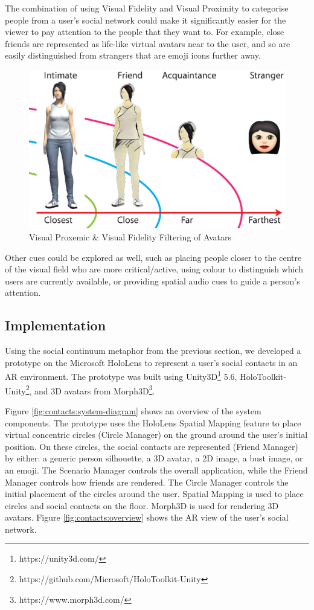 The combination of using Visual Fidelity and Visual Proximity to categorise people from a user's social network could make it significantly easier for the viewer to pay attention to the people that they want to. For example, close friends are represented as life-like virtual avatars near to the user, and so are easily distinguished from strangers that are emoji icons further away.

\begin{figure}[ht]
  \centering
  \includegraphics[width=.8\linewidth]{images/mgia17/writing-images-11.eps}
  \caption{Visual Proxemic \& Visual Fidelity Filtering of Avatars}
    \label{fig:contacts:proximic-circles}
\end{figure}

Other cues could be explored as well, such as placing people closer to the centre of the visual field who are more critical/active, using colour to distinguish which users are currently available, or providing spatial audio cues to guide a person's attention.


\subsection{Implementation}

Using the social continuum metaphor from the previous section, we developed a prototype on the Microsoft HoloLens to represent a user's social contacts in an AR environment. The prototype was built using Unity3D\footnote{https://unity3d.com/} 5.6, HoloToolkit-Unity\footnote{https://github.com/Microsoft/HoloToolkit-Unity}, and 3D avatars from Morph3D\footnote{https://www.morph3d.com/}. 

Figure \ref{fig:contacts:system-diagram} shows an overview of the system components. The prototype uses the HoloLens Spatial Mapping feature to place virtual concentric circles (Circle Manager) on the ground around the user's initial position. On these circles, the social contacts are represented (Friend Manager) by either: a generic person silhouette, a 3D avatar, a 2D image, a bust image, or an emoji. The Scenario Manager controls the overall application, while the Friend Manager controls how friends are rendered. The Circle Manager controls the initial placement of the circles around the user. Spatial Mapping is used to place circles and social contacts on the floor. Morph3D is used for rendering 3D avatars. Figure \ref{fig:contacts:overview} shows the AR view of the user's social network.


